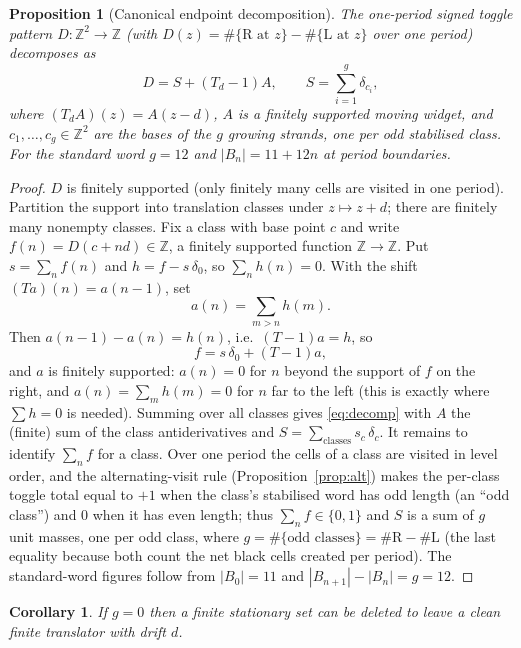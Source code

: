 \documentclass[11pt,reqno]{amsart}
\theoremstyle{plain}
\newtheorem{proposition}[theorem]{Proposition}
\newtheorem{corollary}[theorem]{Corollary}
\theoremstyle{definition}
\newcommand{\Z}{\mathbb{Z}}
\newcommand{\drift}{d}
\newcommand{\growth}{g}
\newcommand{\turnR}{\mathrm{R}}
\newcommand{\turnL}{\mathrm{L}}
\begin{document}
\begin{proposition}[Canonical endpoint decomposition]\label{prop:decomp}
The one-period signed toggle pattern $D:\Z^2\to\Z$ (with $D(z)=\#\{\turnR\text{ at }z\}-\#\{\turnL\text{ at }z\}$ over one period) decomposes as
\begin{equation}\label{eq:decomp}
D=S+(T_\drift-1)A,\qquad S=\sum_{i=1}^{\growth}\delta_{c_i},
\end{equation}
where $(T_\drift A)(z)=A(z-\drift)$, $A$ is a finitely supported \emph{moving widget},
and $c_1,\dots,c_\growth\in\Z^2$ are the bases of the $\growth$ growing strands, one
per odd stabilised class. For the standard word $\growth=12$ and $|B_n|=11+12n$ at
period boundaries.
\end{proposition}

\begin{proof}
$D$ is finitely supported (only finitely many cells are visited in one period).
Partition the support into translation classes under $z\mapsto z+\drift$; there are
finitely many nonempty classes. Fix a class with base point $c$ and write
$f(n)=D(c+n\drift)\in\Z$, a finitely supported function $\Z\to\Z$. Put $s=\sum_n f(n)$
and $h=f-s\,\delta_0$, so $\sum_n h(n)=0$. With the shift $(Ta)(n)=a(n-1)$, set
\[
a(n)=\sum_{m>n}h(m).
\]
Then $a(n-1)-a(n)=h(n)$, i.e.\ $(T-1)a=h$, so
\[
f=s\,\delta_0+(T-1)a,
\]
and $a$ is finitely supported: $a(n)=0$ for $n$ beyond the support of $f$ on the
right, and $a(n)=\sum_m h(m)=0$ for $n$ far to the left (this is exactly where
$\sum h=0$ is needed). Summing over all classes gives \eqref{eq:decomp} with $A$ the
(finite) sum of the class antiderivatives and $S=\sum_{\text{classes}}s_c\,\delta_{c}$. It remains to
identify $\sum_n f$ for a class. Over one period the cells of a class are visited in
level order, and the alternating-visit rule (Proposition~\ref{prop:alt}) makes the
per-class toggle total equal to $+1$ when the class's stabilised word has odd length
(an ``odd class'') and $0$ when it has even length; thus $\sum_n f\in\{0,1\}$ and
$S$ is a sum of $\growth$ unit masses, one per odd class, where
$\growth=\#\{\text{odd classes}\}=\#\turnR-\#\turnL$ (the last equality because both
count the net black cells created per period). The standard-word figures follow from
$|B_0|=11$ and $|B_{n+1}|-|B_n|=\growth=12$.
\end{proof}

\begin{corollary}\label{cor:sep}
If $\growth=0$ then a finite stationary set can be deleted to leave a clean finite
translator with drift $\drift$.
\end{corollary}
\end{document}
